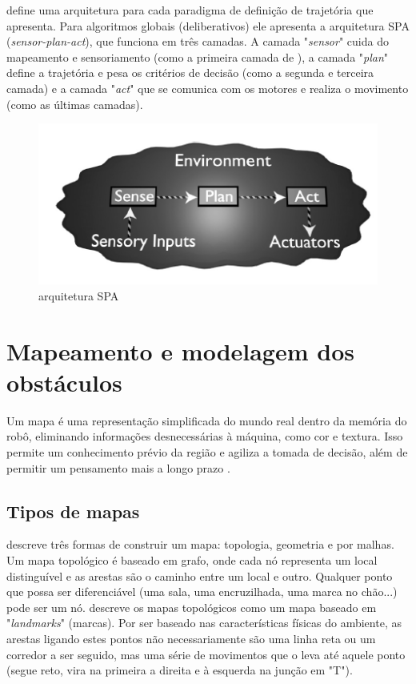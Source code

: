\cite{Mataric2007} define uma arquitetura para cada paradigma de definição de trajetória que apresenta. Para algoritmos globais (deliberativos) ele apresenta a arquitetura SPA (\textit{sensor-plan-act}), que funciona em três camadas. A camada "\textit{sensor}" cuida do mapeamento e sensoriamento (como a primeira camada de \cite{Vieira2005}), a camada "\textit{plan}" define a trajetória e pesa os critérios de decisão (como a segunda e terceira camada) e a camada "\textit{act}" que se comunica com os motores e realiza o movimento (como as últimas camadas).

\begin{figure}[h]
	\centering
	\label{fig05}
		\includegraphics[keepaspectratio=true,scale=0.6]{figuras/6arquiteturaSPA.png}
	\caption{arquitetura SPA \cite{Mataric2007}}
\end{figure}

\section{Mapeamento e modelagem dos obstáculos}

Um mapa é uma representação simplificada do mundo real dentro da memória do robô, eliminando informações desnecessárias à máquina, como cor e textura. Isso permite um conhecimento prévio da região e agiliza a tomada de decisão, além de permitir um pensamento mais a longo prazo \cite{Mataric2007}. 

\subsection{Tipos de mapas}

\cite{Choset2005} descreve três formas de construir um mapa: topologia, geometria e por malhas. Um mapa topológico é baseado em grafo, onde cada nó representa um local distinguível e as arestas são o caminho entre um local e outro. Qualquer ponto que possa ser diferenciável (uma sala, uma encruzilhada, uma marca no chão...) pode ser um nó. \cite{Mataric2007} descreve os mapas topológicos como um mapa baseado em "\textit{landmarks}" (marcas). Por ser baseado nas características físicas do ambiente, as arestas ligando estes pontos não necessariamente são uma linha reta ou um corredor a ser seguido, mas uma série de movimentos que o leva até aquele ponto (segue reto, vira na primeira a direita e à esquerda na junção em "T").

